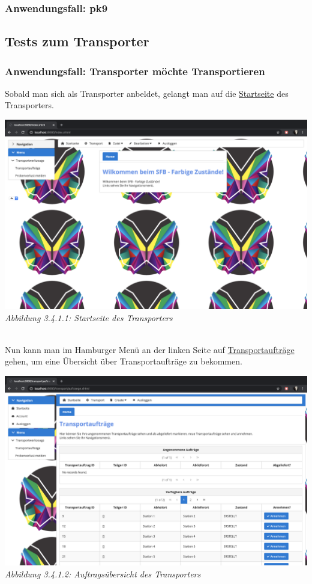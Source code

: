 \documentclass[enabledeprecatedfontcommands,fontsize=12pt,paper=a4,twoside]{scrartcl}
\begin{document}

\subsubsection{Anwendungsfall: pk9}


\subsection{Tests zum Transporter}

\subsubsection{Anwendungsfall: Transporter möchte Transportieren}

Sobald man sich als Transporter anbeldet, gelangt man auf die \hyperlink{sc3.4.1.1}{Startseite} des Transporters. 

\hypertarget{sc3.4.1.1}{
\includegraphics[width=1\textwidth]{Screenshots/3411.png}
\textit{Abbildung 3.4.1.1: Startseite des Transporters}
} \\

Nun kann man im Hamburger Menü an der linken Seite auf \hyperlink{sc3.4.1.2}{Transportaufträge} gehen, um eine Übersicht über Transportaufträge zu bekommen.

\hypertarget{sc3.4.1.2}{
\includegraphics[width=1\textwidth]{Screenshots/3412.png}
\textit{Abbildung 3.4.1.2: Auftragsübersicht des Transporters}
} \\
\end{document}
